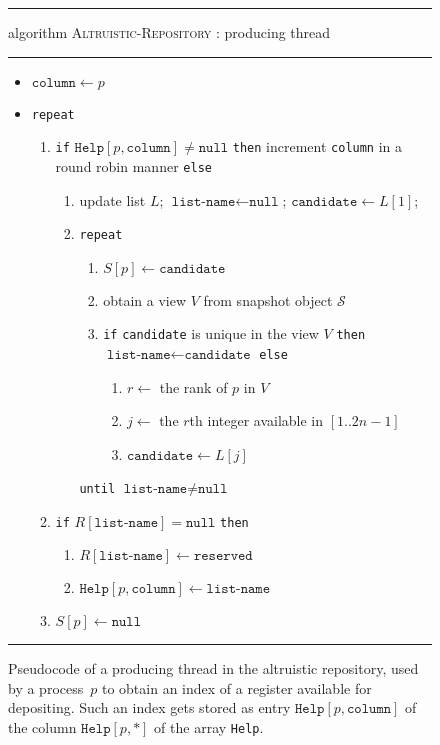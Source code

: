 \documentclass[11pt]{article}
\newcommand{\FF}{\vspace*{\medskipamount}}
\newcommand{\cS}{\mathcal{S}}
\begin{document}
\begin{figure}[t]
\hrule

\FF

\textsf{algorithm} \textsc{Altruistic-Repository} : producing thread

\FF

\hrule

\FF

\begin{itemize}[nosep]
\item[]
$\texttt{column}\leftarrow p$
\item[]
\texttt{repeat}
\begin{enumerate}[nosep]
\item
\texttt{if} $\texttt{Help}[p,\texttt{column}]\ne \texttt{null}$ \texttt{then} increment \texttt{column} in a round robin manner \texttt{else}
\begin{enumerate}
\item
update list $L$; 
$\texttt{list-name}\leftarrow \texttt{null}$;
$\texttt{candidate}\leftarrow L[1]$; 
\item
\texttt{repeat}
\begin{enumerate}[nosep]
\item
$S[p]\leftarrow \texttt{candidate}$
\item
obtain a view $V$ from snapshot object $\cS$
\item
\texttt{if} \texttt{candidate} is unique in the view $V$ \texttt{then} $\texttt{list-name}\leftarrow \texttt{candidate}$ \texttt{else} 
\begin{enumerate}[nosep]
\item
$r\leftarrow$ the rank of $p$ in $V$ 
\item
$j\leftarrow$  the $r$th integer available in $[1..2n-1]$
\item
$\texttt{candidate}\leftarrow L[j]$
\end{enumerate}
\end{enumerate}
\texttt{until} $\texttt{list-name} \ne \texttt{null}$

\end{enumerate}
\item
\label{altruistic-verify-availability}
\texttt{if} $R[\texttt{list-name}]=\texttt{null}$ \texttt{then} 
\begin{enumerate}[nosep]
\item
$R[\texttt{list-name}]\leftarrow \texttt{reserved}$
\item
$\texttt{Help}[p,\texttt{column}]\leftarrow\texttt{list-name}$
\end{enumerate}
 \item 
$S[p]\leftarrow\texttt{null}$
\end{enumerate}
\end{itemize}
\FF

\hrule

\FF

\caption{\label{fig:alg-altruistic-repository-produce}
Pseudocode of a producing thread in the altruistic repository, used by a process~$p$ to obtain an index of a register available for depositing.
Such an index gets stored as entry $\texttt{Help}[p,\texttt{column}]$ of the column $\texttt{Help}[p,*]$ of the array \texttt{Help}.}
\end{figure}
\end{document}
